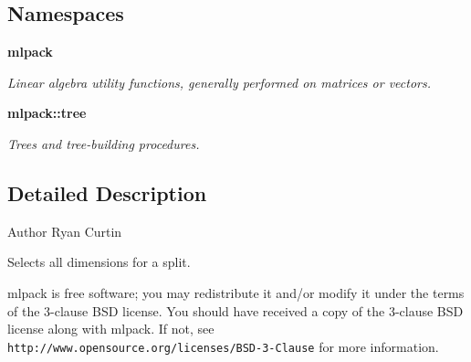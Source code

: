 \subsection*{Namespaces}
\begin{DoxyCompactItemize}
\item 
 \textbf{ mlpack}
\begin{DoxyCompactList}\small\item\em Linear algebra utility functions, generally performed on matrices or vectors. \end{DoxyCompactList}\item 
 \textbf{ mlpack\+::tree}
\begin{DoxyCompactList}\small\item\em Trees and tree-\/building procedures. \end{DoxyCompactList}\end{DoxyCompactItemize}


\subsection{Detailed Description}
\begin{DoxyAuthor}{Author}
Ryan Curtin
\end{DoxyAuthor}
Selects all dimensions for a split.

mlpack is free software; you may redistribute it and/or modify it under the terms of the 3-\/clause B\+SD license. You should have received a copy of the 3-\/clause B\+SD license along with mlpack. If not, see {\tt http\+://www.\+opensource.\+org/licenses/\+B\+S\+D-\/3-\/\+Clause} for more information. 